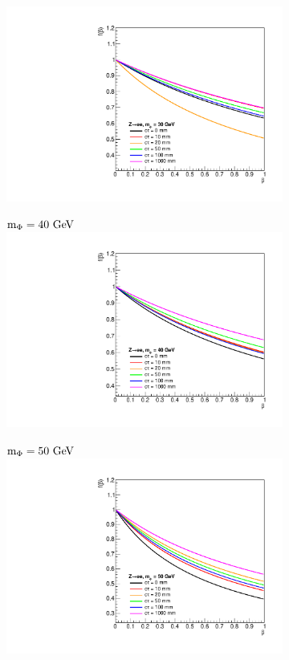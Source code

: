 \begin{figure}[htb!]
\begin{subfigure}{0.3\linewidth}
		\includegraphics[width=\linewidth]{figs/05_analysis/BR_Z_ELE_30.pdf}
	\end{subfigure}
	\begin{subfigure}{0.3\linewidth}
		\centering
		$\mphi=40\unit{GeV}$
		\includegraphics[width=\linewidth]{figs/05_analysis/BR_Z_ELE_40.pdf}
	\end{subfigure}
	\begin{subfigure}{0.3\linewidth}
		\centering
		$\mphi=50\unit{GeV}$
		\includegraphics[width=\linewidth]{figs/05_analysis/BR_Z_ELE_50.pdf}

\end{subfigure}
\end{figure}
